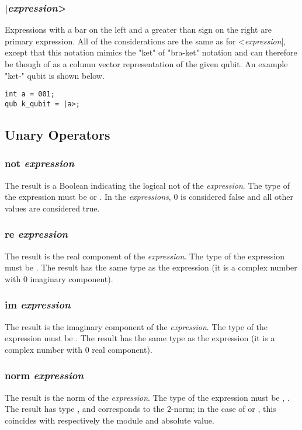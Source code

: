 \subsubsection{|\textit{expression}>}
Expressions with a bar on the left and a greater than sign on the right are primary expression. All of the considerations are the same as for <\textit{expression}|, except that this notation mimics the "ket" of "bra-ket" notation and can therefore be though of as a column vector representation of the given qubit. An example "ket-" qubit is shown below.

\begin{lstlisting}
int a = 001;
qub k_qubit = |a>;
\end{lstlisting}

\subsection{Unary Operators}
\subsubsection{not \textit{expression}}
The result is a Boolean indicating the logical \textsf{not} of the \textit{expression}. The type of the expression must be \integ or \float. In the \textit{expressions}, 0 is considered false and all other values are considered true.
\subsubsection{re \textit{expression}}
The result is the real component of the \textit{expression}. The type of the expression must be  \complex. The result has the same type as the expression (it is a complex number with  0 imaginary component).
\subsubsection{im \textit{expression}}
The result is the imaginary component of the \textit{expression}. The type of the expression must be  \complex. The result has the same type as the expression (it is a complex number with  0 real component).
\subsubsection{norm \textit{expression}}
The result is the norm of the \textit{expression}. The type of the expression must be \mat, . The result has type \float, and corresponds to the $2$-norm; in the case of \complex or \float, this coincides with respectively the module and absolute value.
